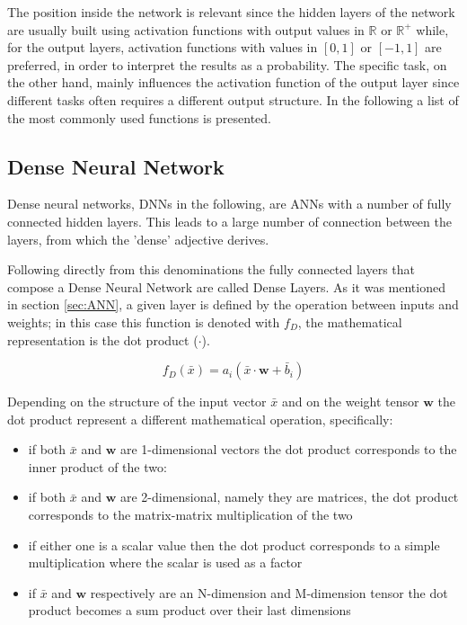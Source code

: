 \documentclass[../../main.tex]{subfiles}
\begin{document}
The position inside the network is relevant since the hidden layers of the network are usually built using activation functions with output values in $\mathbb{R}$ or $\mathbb{R}^+$ while, for the output layers, activation functions with values in $[0,1]$ or $[-1,1]$ are preferred, in order to interpret the results as a probability.
The specific task, on the other hand, mainly influences the activation function of the output layer since different tasks often requires a different output structure.
In the following a list of the most commonly used functions is presented.  



\clearpage
    
\subsection{Dense Neural Network}
\label{sec:DNN}
Dense neural networks, DNNs in the following, are ANNs with a number of fully connected hidden layers. This leads to a large number of connection between the layers, from which the 'dense' adjective derives.  

Following directly from this denominations the fully connected layers that compose a Dense Neural Network are called Dense Layers. As it was mentioned in section \ref{sec:ANN}, a given layer is defined by the operation between inputs and weights; in this case this function is denoted with $f_D$, the mathematical representation is the dot product ($\cdot$).

\begin{equation}
    f_D (\bar{x})=a_i \left( \bar{x} \cdot \textbf{w} + \bar{b}_i \right) 
    \label{eq:layer_dense}
\end{equation}

Depending on the structure of the input vector $\bar{x}$ and on the weight tensor $\boldsymbol{w}$ the dot product represent a different mathematical operation, specifically:
\begin{itemize}
    \item if both $\bar{x}$ and $\textbf{w}$ are 1-dimensional vectors the dot product corresponds to the inner product of the two:
    \item if both $\bar{x}$ and $\textbf{w}$ are 2-dimensional, namely they are matrices, the dot product corresponds to the matrix-matrix multiplication of the two
     \item if either one is a scalar value then the dot product corresponds to a simple multiplication where the scalar is used as a factor
     \item if $\bar{x}$ and $\boldsymbol{w}$ respectively are an N-dimension and M-dimension tensor the dot product becomes a sum product over their last dimensions
\end{itemize}
\end{document}
